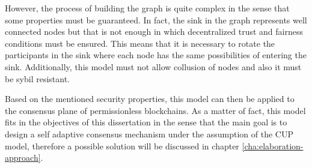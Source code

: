 However, the process of building the graph is quite complex in the sense that some properties must be guaranteed. In fact, the sink in the graph represents well connected nodes but that is not enough in which decentralized trust and fairness conditions must be ensured. This means that it is necessary to rotate the participants in the sink where each node has the same possibilities of entering the sink. Additionally, this model must not allow collusion of nodes and also it must be sybil resistant.

Based on the mentioned security properties, this model can then be applied to the consensus plane of permissionless blockchains. As a matter of fact, this model fits in the objectives of this dissertation in the sense that the main goal is to design a self adaptive consensus mechanism under the assumption of the \gls{CUP} model, therefore a possible solution will be discussed in chapter \ref{cha:elaboration-approach}.





% 
% 


